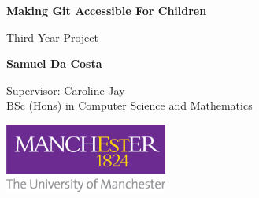 \begin{titlepage}
   \begin{center}
       \vspace*{1cm}
 
       \LARGE\textbf{Making Git Accessible For Children}
 
       \vspace{0.5cm}
        Third Year Project
 
       \vspace{1.5cm}
 
       \textbf{Samuel Da Costa}
 
       \vfill
 
 	  Supervisor: Caroline Jay \\
       BSc (Hons) in Computer Science and Mathematics
 
       \vspace{0.8cm}
 
       \includegraphics[width=0.4\textwidth]{figures/university}
 	\normalsize
 
   \end{center}
\end{titlepage}
